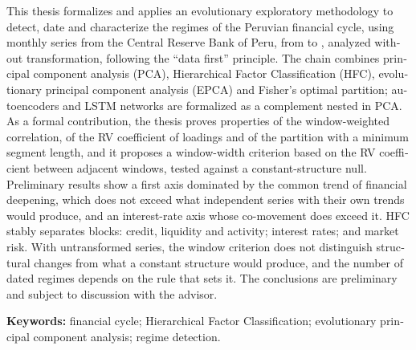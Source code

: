 \begin{otherlanguage}{english}
This thesis formalizes and applies an evolutionary exploratory methodology to detect, date and
characterize the regimes of the Peruvian financial cycle, using \nSeries{} monthly series from
the Central Reserve Bank of Peru, from \anioInicioDatos{} to \anioFinDatos{}, analyzed without
transformation, following the ``data first'' principle. The chain combines principal component
analysis (PCA), Hierarchical Factor Classification (HFC), evolutionary principal component
analysis (EPCA) and Fisher's optimal partition; autoencoders and LSTM networks are formalized as
a complement nested in PCA. As a formal contribution, the thesis proves properties of the
window-weighted correlation, of the RV coefficient of loadings and of the partition with a
minimum segment length, and it proposes a window-width criterion based on the RV coefficient
between adjacent windows, tested against a constant-structure null. Preliminary results show a first axis dominated by the
common trend of financial deepening, which does not exceed what independent series with their own
trends would produce, and an interest-rate axis whose co-movement does exceed it. HFC stably
separates \clasesHfcMenor{} blocks: credit, liquidity and activity; interest rates; and market risk. With
untransformed series, the window criterion does not distinguish structural changes from what a
constant structure would produce, and the number of dated regimes depends on the rule that sets
it. The conclusions are preliminary and subject to discussion with the advisor.

\medskip
\textbf{Keywords:} financial cycle; Hierarchical Factor Classification; evolutionary principal
component analysis; regime detection.
\end{otherlanguage}
